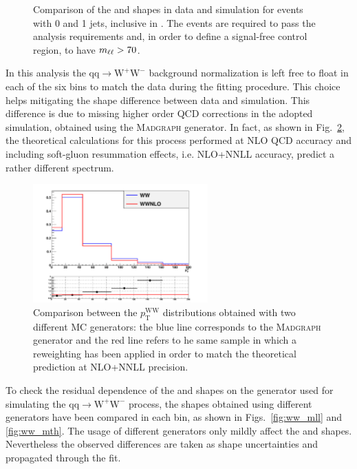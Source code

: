\begin{figure}[htb]
{}

\caption{Comparison of the \mll and \mt shapes in data and simulation for events with 0 and 1 jets, inclusive in \pth. The events are required to pass the analysis requirements and, in order to define a signal-free control region, to have $m_{\ell\ell} > 70$\GeV.\label{fig:WW}}
\end{figure}

In this analysis the $\mathrm{qq\to W^{+}W^{-}}$ background normalization is left free to float in each of the six \pth bins to match the data during the fitting procedure. This choice helps mitigating the \pth shape difference between data and simulation. This difference is due to missing higher order QCD corrections in the adopted simulation, obtained using the \textsc{Madgraph} generator. In fact, as shown in Fig.~\ref{fig:ww_wwnlo}, the theoretical calculations for this process performed at NLO QCD accuracy and including soft-gluon resummation effects, i.e. NLO+NNLL accuracy, predict a rather different \pth spectrum.

\begin{figure}[htb]
\centering
\includegraphics[width=0.6\textwidth]{images/WWnlo/WW_WWnlo.pdf}
\caption{Comparison between the $p_\mathrm{T}^\mathrm{WW}$ distributions obtained with two different MC generators: the blue line corresponds to the \textsc{Madgraph} generator and the red line refers to he same sample in which a reweighting has been applied in order to match the theoretical prediction at NLO+NNLL precision. }\label{fig:ww_wwnlo}
\end{figure}

To check the residual dependence of the \mll and \mt shapes on the generator used for simulating the $\mathrm{qq\to W^{+}W^{-}}$ process, the shapes obtained using different generators have been compared in each \pth bin, as shown in Figs.~\ref{fig:ww_mll} and \ref{fig:ww_mth}. The usage of different generators only mildly affect the \mll and \mt shapes. Nevertheless the observed differences are taken as shape uncertainties and propagated through the fit.

